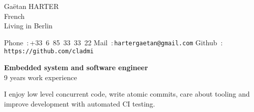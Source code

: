 \documentclass{cv}
\begin{document}
\begin{chapeau}
\hspace{1cm}
\begin{adresse}
        Gaëtan HARTER\\
        French \\
        Living in Berlin
\end{adresse}
\begin{etatcivil}
        Phone~:\,+33~6~85~33~33~22
        Mail~:\,\texttt{hartergaetan@gmail.com}
        Github~:\,\texttt{https://github.com/cladmi}
\end{etatcivil}
\hspace{2cm}
\end{chapeau}

\begin{center}
        \textbf{\Large Embedded system and software engineer\\}
        \large 9 years work experience\\

        \vspace{0.5em}
        \begin{minipage}{15cm}
          \begin{center}
            \large I enjoy low level concurrent code, write atomic commits, care about tooling and improve development with automated CI testing.
          \end{center}
        \end{minipage}
\end{center}
\end{document}
